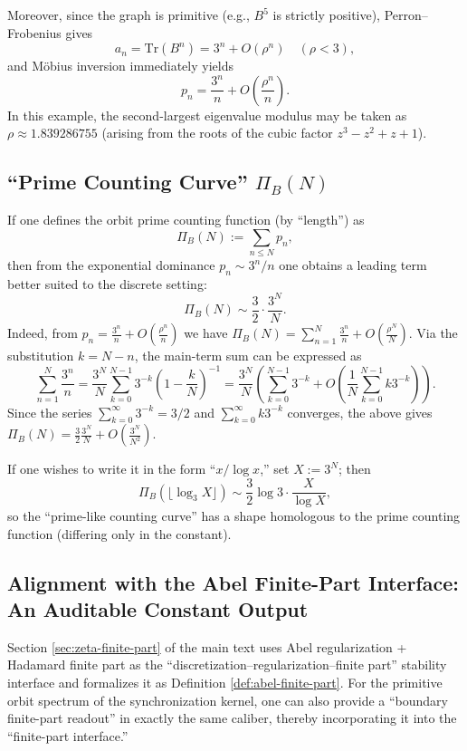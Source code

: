Moreover, since the graph is primitive (e.g., $B^5$ is strictly positive), Perron--Frobenius gives
\[
a_n=\mathrm{Tr}(B^n)=3^n+O(\rho^n)
\quad(\rho<3),
\]
and M\"obius inversion immediately yields
\[
p_n=\frac{3^n}{n}+O\!\left(\frac{\rho^n}{n}\right).
\]
In this example, the second-largest eigenvalue modulus may be taken as $\rho\approx 1.839286755$ (arising from the roots of the cubic factor $z^3-z^2+z+1$).

\subsection{``Prime Counting Curve'' \texorpdfstring{$\Pi_B(N)$}{Pi\_B(N)}}
If one defines the orbit prime counting function (by ``length'') as
\[
\Pi_B(N):=\sum_{n\le N}p_n,
\]
then from the exponential dominance $p_n\sim 3^n/n$ one obtains a leading term better suited to the discrete setting:
\[
\Pi_B(N)\sim \frac{3}{2}\cdot \frac{3^N}{N}.
\]
Indeed, from $p_n = \frac{3^n}{n} + O(\frac{\rho^n}{n})$ we have $\Pi_B(N) = \sum_{n=1}^N \frac{3^n}{n} + O(\frac{\rho^N}{N})$. Via the substitution $k = N - n$, the main-term sum can be expressed as
\[
\sum_{n=1}^N \frac{3^n}{n} = \frac{3^N}{N} \sum_{k=0}^{N-1} 3^{-k} \left( 1 - \frac{k}{N} \right)^{-1} = \frac{3^N}{N} \left( \sum_{k=0}^{N-1} 3^{-k} + O\left(\frac{1}{N}\sum_{k=0}^{N-1} k 3^{-k}\right) \right).
\]
Since the series $\sum_{k=0}^\infty 3^{-k} = 3/2$ and $\sum_{k=0}^\infty k 3^{-k}$ converges, the above gives $\Pi_B(N) = \frac{3}{2} \frac{3^N}{N} + O\left(\frac{3^N}{N^2}\right)$.

If one wishes to write it in the form ``$x/\log x$,'' set $X:=3^N$; then
\[
\Pi_B(\lfloor \log_3 X\rfloor)\sim \frac{3}{2}\log 3\cdot \frac{X}{\log X},
\]
so the ``prime-like counting curve'' has a shape homologous to the prime counting function (differing only in the constant).

\subsection{Alignment with the Abel Finite-Part Interface: An Auditable Constant Output}
Section \ref{sec:zeta-finite-part} of the main text uses Abel regularization + Hadamard finite part as the ``discretization--regularization--finite part'' stability interface and formalizes it as Definition \ref{def:abel-finite-part}. For the primitive orbit spectrum of the synchronization kernel, one can also provide a ``boundary finite-part readout'' in exactly the same caliber, thereby incorporating it into the ``finite-part interface.''

